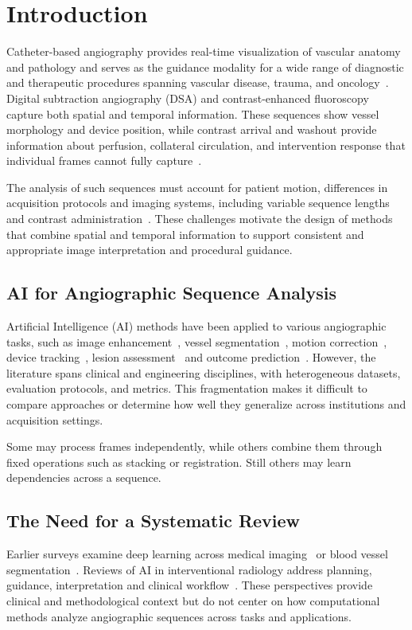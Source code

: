 \section{Introduction}
\label{sec:introduction}

Catheter-based angiography provides real-time visualization of vascular anatomy and pathology and serves as the guidance modality for a wide range of diagnostic and therapeutic procedures spanning vascular disease, trauma, and oncology~\cite{valji2011practice,kaufman2013vascular}. Digital subtraction angiography (DSA) and contrast-enhanced fluoroscopy capture both spatial and temporal information. These sequences show vessel morphology and device position, while contrast arrival and washout provide information about perfusion, collateral circulation, and intervention response that individual frames cannot fully capture~\cite{ACRReporting2024}.

The analysis of such sequences must account for patient motion, differences in acquisition protocols and imaging systems, including variable sequence lengths and contrast administration~\cite{shi2021temporal}. These challenges motivate the design of methods that combine spatial and temporal information to support consistent and appropriate image interpretation and procedural guidance.

\subsection{AI for Angiographic Sequence Analysis}
Artificial Intelligence (AI) methods have been applied to various angiographic tasks, such as image enhancement~\cite{ref152}, vessel segmentation~\cite{ref64}, motion correction~\cite{R2400}, device tracking~\cite{ref99}, lesion assessment~\cite{ref100} and outcome prediction~\cite{ref127}. However, the literature spans clinical and engineering disciplines, with heterogeneous datasets, evaluation protocols, and metrics. This fragmentation makes it difficult to compare approaches or determine how well they generalize across institutions and acquisition settings.

 Some may process frames independently, while others combine them through fixed operations such as stacking or registration. Still others may learn dependencies across a sequence. 


\subsection{The Need for a Systematic Review}
Earlier surveys examine deep learning across medical imaging~\cite{Litjens2017,Shen2017} or blood vessel segmentation~\cite{Moccia2018}. Reviews of AI in interventional radiology address planning, guidance, interpretation and clinical workflow~\cite{Iezzi2019,Gurgitano2021,Mukhtar2025}. These perspectives provide clinical and methodological context but do not center on how computational methods analyze angiographic sequences across tasks and applications.

